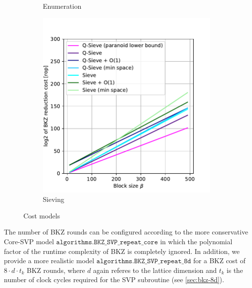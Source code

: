 \begin{figure}[h!]
\begin{subfigure}{0.5\textwidth}
        \caption{Enumeration}\label{fig:costmodels-enum}
    \end{subfigure}
    \begin{subfigure}{0.49\textwidth}
        \centering
        \includegraphics[width=1\textwidth]{graphics/cost_models_sieving.pdf}
        \caption{Sieving}\label{fig:costmodels-sieving}
    \end{subfigure}
    \caption{Cost models}\label{fig:costmodels}
\end{figure}
The number of BKZ rounds can be configured according to the more conservative Core-SVP model $\texttt{algorithms.BKZ\_SVP\_repeat\_core}$ \cite{ADPS16} in which the polynomial factor of the runtime complexity of BKZ is completely ignored. In addition, we provide a more realistic model $\texttt{algorithms.BKZ\_SVP\_repeat\_8d}$ for a BKZ cost of $8 \cdot d \cdot t_k$ BKZ rounds, where $d$ again referes to the lattice dimension and $t_k$ is the number of clock cycles required for the SVP subroutine (see \cref{sec:bkz-8d}). %


